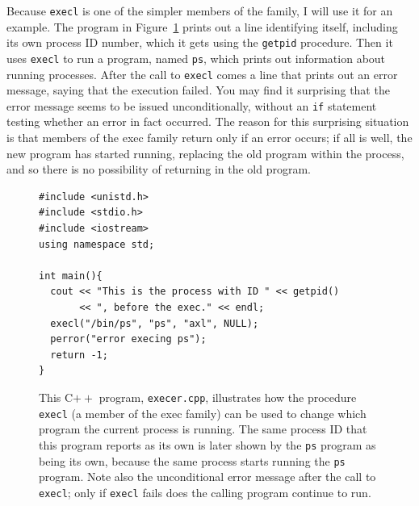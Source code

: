 Because \verb|execl| is one of the
simpler members of the family, I will use it for an example.  The
program in Figure~\ref{execer-code} prints out a line identifying
itself, including its own process ID number, which it gets using the 
\verb|getpid| procedure.  Then it uses
\verb|execl| to run a program, named \verb|ps|,
which prints out information about running processes.  After the call
to \verb|execl| comes a line that prints out an error message, saying
that the execution failed.  You may find it surprising that the error
message seems to be issued unconditionally, without an \verb|if|
statement testing whether an error in fact occurred.  The reason for
this surprising situation is that members of the exec family return
only if an error occurs; if all is well, the new program has started
running, replacing the old program within the process, and so there is
no possibility of returning in the old program.
\begin{figure}
\begin{verbatim}
#include <unistd.h>
#include <stdio.h>
#include <iostream>
using namespace std;

int main(){
  cout << "This is the process with ID " << getpid()
       << ", before the exec." << endl;
  execl("/bin/ps", "ps", "axl", NULL);
  perror("error execing ps");
  return -1;
}
\end{verbatim}
\caption{This C$++$ program, {\tt execer.cpp}, illustrates how the
    procedure {\tt
    execl} (a member of the exec family) can be used to change which
    program the current process is running.  The same process ID that
    this program reports as its own is later shown by the {\tt ps}
    program as being its own, because the same process starts running
    the {\tt ps} program.  Note also the unconditional error message
    after the call to {\tt execl}; only if {\tt execl} fails does the
    calling program continue to run.}
\label{execer-code}
\end{figure}

